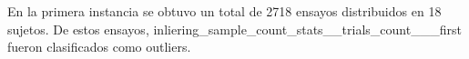 En la primera instancia se obtuvo un total de 2718 ensayos distribuidos en 18
sujetos.
De estos ensayos, {inliering_sample_count_stats__trials_count___first} fueron clasificados como outliers.
